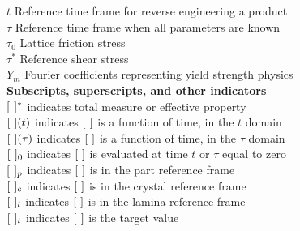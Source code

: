 \begin{tabbing}
$t$             \> Reference time frame for reverse engineering a product\\
$\tau$          \> Reference time frame when all parameters are known\\
$\tau_0$            \> Lattice friction stress\\
$\tau^*$                \> Reference shear stress\\
$Y_m$               \> Fourier coefficients representing yield strength physics\\
\textbf{Subscripts, superscripts, and other indicators}\\
$[\hspace{.05in}]^*$          \> indicates total measure or effective property\\
$[\hspace{.05in}](t)$         \> indicates $[\hspace{.05in}]$ is a function of time, in the $t$ domain\\
$[\hspace{.05in}](\tau)$      \> indicates $[\hspace{.05in}]$ is a function of time, in the $\tau$ domain\\
$[\hspace{.05in}]_0$          \> indicates $[\hspace{.05in}]$ is evaluated at time $t$ or $\tau$ equal to zero\\
$[\hspace{0.05in}]_p$         \> indicates $[\hspace{.05in}]$ is in the part reference frame\\
$[\hspace{0.05in}]_c$         \> indicates $[\hspace{.05in}]$ is in the crystal reference frame\\
$[\hspace{0.05in}]_l$         \> indicates $[\hspace{.05in}]$ is in the lamina reference frame\\
$[\hspace{0.05in}]_t$         \> indicates $[\hspace{.05in}]$ is the target value
\end{tabbing} 